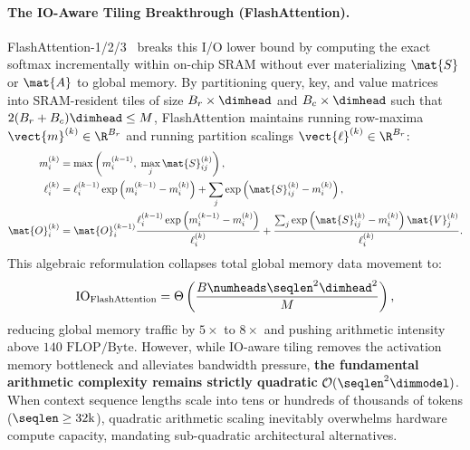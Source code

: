 \paragraph{The IO-Aware Tiling Breakthrough (FlashAttention).}
FlashAttention-1/2/3~\cite{dao2022flashattention,dao2023flashattention2,shah2024flashattention3} breaks this I/O lower bound by computing the exact softmax incrementally within on-chip SRAM without ever materializing $\mat{S}$ or $\mat{A}$ to global memory. By partitioning query, key, and value matrices into SRAM-resident tiles of size $B_r \times \dimhead$ and $B_c \times \dimhead$ such that $2(B_r + B_c)\dimhead \le M$, FlashAttention maintains running row-maxima $\vect{m}^{(k)} \in \R^{B_r}$ and running partition scalings $\vect{\ell}^{(k)} \in \R^{B_r}$:
\begin{align}
m_i^{(k)} &= \max\left( m_i^{(k-1)}, \; \max_{j} \mat{S}_{ij}^{(k)} \right), \label{eq:online_softmax_m} \\
\ell_i^{(k)} &= \ell_i^{(k-1)} \exp\left( m_i^{(k-1)} - m_i^{(k)} \right) + \sum_{j} \exp\left( \mat{S}_{ij}^{(k)} - m_i^{(k)} \right), \label{eq:online_softmax_l} \\
\mat{O}_i^{(k)} &= \mat{O}_i^{(k-1)} \frac{\ell_i^{(k-1)} \exp\left( m_i^{(k-1)} - m_i^{(k)} \right)}{\ell_i^{(k)}} + \frac{\sum_j \exp\left( \mat{S}_{ij}^{(k)} - m_i^{(k)} \right) \mat{V}_j^{(k)}}{\ell_i^{(k)}}. \label{eq:online_softmax_o}
\end{align}
This algebraic reformulation collapses total global memory data movement to:
\begin{equation}
\operatorname{IO}_{\text{FlashAttention}} = \Theta\left( \frac{B \numheads \seqlen^2 \dimhead^2}{M} \right),
\label{eq:flashattention_io_complexity}
\end{equation}
reducing global memory traffic by $5\times$ to $8\times$ and pushing arithmetic intensity above $140\text{ FLOP/Byte}$. However, while IO-aware tiling removes the activation memory bottleneck and alleviates bandwidth pressure, \textbf{the fundamental arithmetic complexity remains strictly quadratic} $\mathcal{O}(\seqlen^2 \dimmodel)$. When context sequence lengths scale into tens or hundreds of thousands of tokens ($\seqlen \ge 32\text{k}$), quadratic arithmetic scaling inevitably overwhelms hardware compute capacity, mandating sub-quadratic architectural alternatives.

